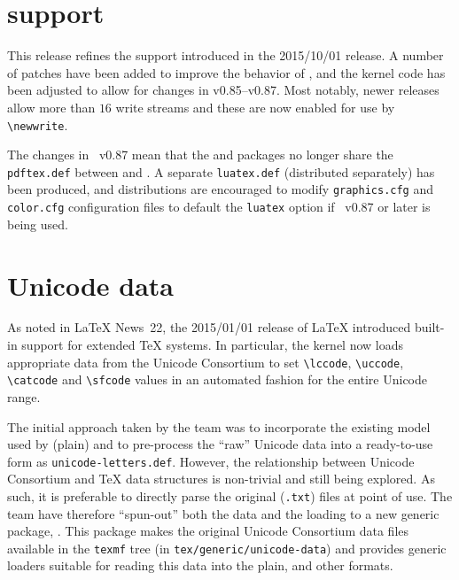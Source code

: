 \documentclass{ltnews}
\begin{document}
\maketitle

\section{ support}

This release refines the  support introduced in the
2015/10/01 release. A number of patches have been added to improve the
behavior of , and the kernel code has been adjusted to
allow for changes in  v0.85--v0.87. Most notably, newer
 releases allow more than $16$ write streams and these are now
enabled for use by \verb|\newwrite|.

The changes in ~v0.87 mean that the  and
 packages no longer share the \texttt{pdftex.def}
between and . A separate
\texttt{luatex.def} (distributed separately) has been produced, and
distributions are encouraged to modify \texttt{graphics.cfg} and
\texttt{color.cfg} configuration files to default the \texttt{luatex}
option if ~v0.87 or later is being used.

\section{Unicode data}

As noted in \LaTeX{} News~22, the 2015/01/01 release of \LaTeX{} introduced
built-in support for extended \TeX{} systems. In particular, the kernel now
loads appropriate data from the Unicode Consortium to set \verb|\lccode|,
\verb|\uccode|, \verb|\catcode| and \verb|\sfcode| values in an automated
fashion for the entire Unicode range.

The initial approach taken by the team was to incorporate the existing model
used by (plain)  and to pre-process the ``raw'' Unicode data into
a ready-to-use form as \verb|unicode-letters.def|. However, the relationship
between Unicode Consortium and \TeX{} data structures is non-trivial and still
being explored. As such, it is preferable to directly parse the original
(\verb|.txt|) files at point of use. The team have therefore ``spun-out'' both
the data and the loading to a new generic package, . This
package makes the original Unicode Consortium data files available in the
\verb|texmf| tree (in \verb|tex/generic/unicode-data|) and provides generic
loaders suitable for reading this data into the plain, \LaTeXe{} and other
formats.
\end{document}
